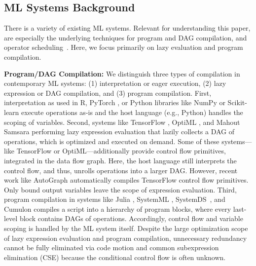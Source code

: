 \subsection{ML Systems Background}
\label{sec:mlsys}

There is a variety of existing ML systems. Relevant for understanding this paper, are especially the underlying techniques for program and DAG compilation, and operator scheduling~\cite{2019Boehm}. Here, we focus primarily on lazy evaluation and program compilation.

\textbf{Program/DAG Compilation:} We distinguish three types of compilation in contemporary ML systems: (1) interpretation or eager execution, (2) lazy expression or DAG compilation, and (3) program compilation. First, interpretation as used in R, PyTorch \cite{PaszkeGMLBCKLGA19}, or Python libraries like NumPy \cite{WaltCV11} or Scikit-learn \cite{PedregosaVGMTGBPWDVPCBPD11} execute operations as-is and the host language (e.g., Python) handles the scoping of variables. Second, systems like TensorFlow \cite{AbadiBCCDDDGIIK16}, OptiML \cite{SujeethLBRCWAOO11}, and Mahout Samsara \cite{MahoutSamsara} performing lazy expression evaluation that lazily collects a DAG of operations, which is optimized and executed on demand. Some of these systems---like TensorFlow or OptiML---additionally provide control flow primitives, integrated in the data flow graph. Here, the host language still interprets the control flow, and thus, unrolls operations into a larger DAG. However, recent work like AutoGraph \cite{abs-1810-08061} automatically compiles TensorFlow control flow primitives. Only bound output variables leave the scope of expression evaluation. Third, program compilation in systems like Julia \cite{BezansonEKS17}, SystemML \cite{BoehmDEEMPRRSST16}, SystemDS~\cite{BoehmADGIKLPR20}, and Cumulon \cite{HuangB013} compiles a script into a hierarchy of program blocks, where every last-level block contains DAGs of operations. Accordingly, control flow and variable scoping is handled by the ML system itself. Despite the large optimization scope of lazy expression evaluation and program compilation, unnecessary redundancy cannot be fully eliminated via code motion and common subexpression elimination (CSE) because the conditional control flow is often unknown.

